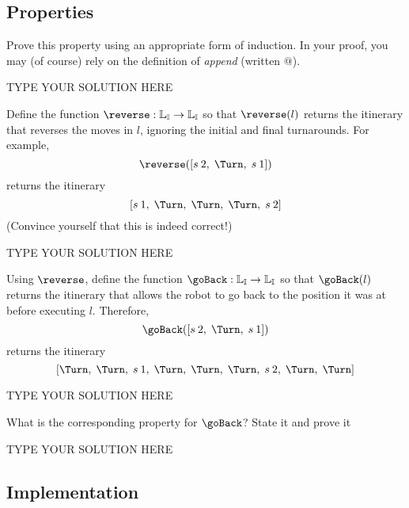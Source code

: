 \documentclass[11pt]{article}
\begin{document}
\subsection{Properties}

\begin{task}{6} %
Prove this property using an appropriate form of induction.  In your proof,
you may (of course) rely on the definition of \emph{append} (written $@$).
\end{task}

\begin{solution}
TYPE YOUR SOLUTION HERE
\end{solution}


\begin{task}{2} %
Define the function $\reverse: \mathbb{L_I} \rightarrow \mathbb{L_I}$ so that
$\reverse(l)$ returns the itinerary that reverses the moves in $l$, ignoring
the initial and final turnarounds.  For example,
$$
\reverse([\Step{2},\; \Turn,\; \Step{1}])
$$
returns the itinerary
$$
[\Step{1},\; \Turn,\; \Turn,\; \Turn,\; \Step{2}]
$$
(Convince yourself that this is indeed correct!)
\end{task}

\begin{solution}
TYPE YOUR SOLUTION HERE
\end{solution}


\begin{task}{1} %
Using $\reverse$, define the function $\goBack: \mathbb{L_I}
\rightarrow \mathbb{L_I}$ so that $\goBack(l)$ returns the itinerary that
allows the robot to go back to the position it was at before executing $l$.
Therefore,
$$
\goBack([\Step{2},\; \Turn,\; \Step{1}])
$$
returns the itinerary
$$
[\Turn,\; \Turn,\;
 \Step{1},\;
 \Turn,\; \Turn,\; \Turn,\;
 \Step{2},\;
 \Turn,\; \Turn]
$$
\end{task}

\begin{solution}
TYPE YOUR SOLUTION HERE
\end{solution}


\begin{task}{3} %
What is the corresponding property for $\goBack$?  State it and prove it
\end{task}

\begin{solution}
TYPE YOUR SOLUTION HERE
\end{solution}


\subsection{Implementation}

\addtocounter{taskNum}{1}
\addtocounter{taskNum}{1}
\addtocounter{taskNum}{1}
\addtocounter{taskNum}{1}
\addtocounter{taskNum}{1}
\addtocounter{taskNum}{1}
\end{document}
